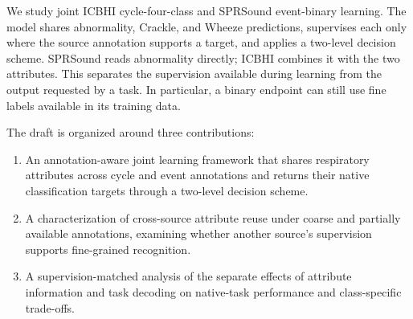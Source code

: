 We study joint ICBHI cycle-four-class and SPRSound event-binary learning.
The model shares abnormality, Crackle, and Wheeze predictions, supervises each
only where the source annotation supports a target, and applies a two-level
decision scheme. SPRSound reads abnormality directly; ICBHI combines it with
the two attributes. This separates the supervision available during learning
from the output requested by a task. In particular, a binary endpoint can
still use fine labels available in its training data.

The draft is organized around three contributions:
\begin{enumerate}
\item An annotation-aware joint learning framework that shares respiratory
attributes across cycle and event annotations and returns their native
classification targets through a two-level decision scheme.
\item A characterization of cross-source attribute reuse under coarse and
partially available annotations, examining whether another source's
supervision supports fine-grained recognition.
\item A supervision-matched analysis of the separate effects of attribute
information and task decoding on native-task performance and class-specific
trade-offs.
\end{enumerate}

